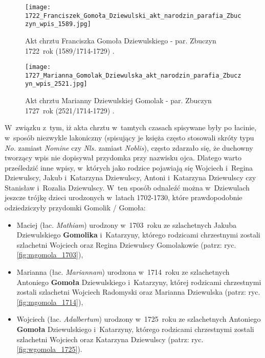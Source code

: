 \begin{figure}[!ht]
    \vspace*{0.5cm}
    \centering \texttt{[image: 
        1722\_Franciszek\_Gomoła\_Dziewulski\_akt\_narodzin\_parafia\_Zbuczyn\_wpis\_1589.jpg]}
    \captionsetup{format=hang}
    \caption{Akt chrztu Franciszka Gomoła Dziewulskiego - par. Zbuczyn 
    1722~rok (1589/1714-1729) \cite{par_zbuczyn2}.}
    \label{fig:fgomola_1722}
\end{figure}

\begin{figure}[!ht]
    \vspace*{0.5cm}
    \centering \texttt{[image: 
        1727\_Marianna\_Gomolak\_Dziewulska\_akt\_narodzin\_parafia\_Zbuczyn\_wpis\_2521.jpg]}
    \captionsetup{format=hang}
    \caption{Akt chrztu Marianny Dziewulskiej Gomolak - par. Zbuczyn 1727~rok 
    (2521/1714-1729) \cite{par_zbuczyn2}.}
    \label{fig:mgomola_1727}
\end{figure}

W~związku z~tym, iż akta chrztu w~tamtych czasach spisywane były po łacinie, 
w~sposób niezwykle lakoniczny (spisujący je księża często stosowali skróty 
typu \emph{No.} zamiast \emph{Nomine} czy \emph{Nls.} zamiast \emph{Noblis}), 
często zdarzało się, że duchowny tworzący wpis nie dopisywał przydomka przy 
nazwisku ojca. Dlatego warto prześledzić inne wpisy, w~których jako rodzice 
pojawiają się Wojciech i~Regina Dziewulscy, Jakub i~Katarzyna Dziewulscy, 
Antoni i~Katarzyna Dziewulscy czy Stanisław i~Rozalia Dziewulscy. W~ten 
sposób odnaleźć można w~Dziewulach jeszcze trójkę dzieci urodzonych w~latach 
1702-1730, które prawdopodobnie odziedziczyły przydomki Gomolik / Gomoła:

\begin{itemize}
\item Maciej (łac. \emph{Mathiam}) urodzony w~1703~roku ze szlachetnych 
Jakuba Dziewulskiego \textbf{Gomolika} i~Katarzyny, którego rodzicami 
chrzestnymi zostali szlachetni Wojciech oraz Regina Dziewulscy Gomolakowie 
(patrz: ryc. \ref{fig:mgomola_1703}),
\item Marianna (łac. \emph{Mariannam}) urodzona w~1714~roku ze szlachetnych 
Antoniego \textbf{Gomoła} Dziewulskiego i~Katarzyny, której rodzicami 
chrzestnymi zostali szlachetni Wojciech Radomyski oraz Marianna Dziewulska 
(patrz: ryc. \ref{fig:mgomola_1714}),
\item Wojciech (łac. \emph{Adalbertum}) urodzony w~1725~roku ze szlachetnych 
Antoniego \textbf{Gomoła} Dziewulskiego i~Katarzyny, którego rodzicami 
chrzestnymi zostali szlachetni Wojciech oraz Katarzyna Dziewulscy 
(patrz: ryc. \ref{fig:wgomola_1725}).
\end{itemize}

